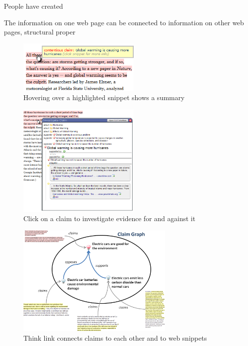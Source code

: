 \documentclass{chi2009}
\begin{document}
People have created 


 The information on one web page can be connected to information on other web pages, structural proper


\begin{figure}[tb]
	\begin{center}
	\includegraphics[width=6cm]{../screenshots/highlight_crop.png}
	\caption{Hovering over a highlighted snippet shows a summary}
	\label{highlight}
	\end{center}
\end{figure}

\begin{figure}[tb]
	\begin{center}
	\includegraphics[width=6cm]{../screenshots/claim_popup_crop2.png}
	\caption{Click on a claim to investigate evidence for and against it}
	\label{claimview}
	\end{center}
\end{figure}

\begin{figure}[tb]
	\begin{center}
	\includegraphics[width=7.7cm]{../screenshots/summary_graph.png}
	\caption{Think link connects claims to each other and to web snippets}
	\label{summarygraph}
	\end{center}
\end{figure}
\end{document}
